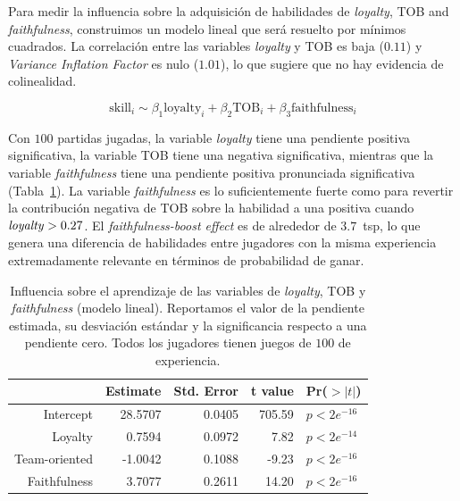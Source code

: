 \documentclass[a4paper,11pt]{book}
\theoremstyle{definition}
\begin{document}

Para medir la influencia sobre la adquisici\'on de habilidades de \emph{loyalty}, TOB and \emph{faithfulness}, construimos un modelo lineal que ser\'a resuelto por m\'inimos cuadrados.
%
La correlaci\'on entre las variables \emph{loyalty} y TOB es baja ($0.11$) y \emph{Variance Inflation Factor} es nulo ($1.01$), lo que sugiere que no hay evidencia de colinealidad.

\begin{equation}
\text{skill}_i \sim \beta_1\text{loyalty}_i + \beta_2\text{TOB}_i + \beta_3\text{faithfulness}_i
\end{equation}

Con $100$ partidas jugadas, la variable \emph{loyalty} tiene una pendiente positiva significativa, la variable TOB tiene una negativa significativa, mientras que la variable \emph{faithfulness} tiene una pendiente positiva pronunciada significativa (Tabla~\ref{model}).
%
La variable \emph{faithfulness} es lo suficientemente fuerte como para revertir la contribuci\'on negativa de TOB sobre la habilidad a una positiva cuando $\text{\emph{loyalty}}>0.27$.
%
El \emph{faithfulness-boost effect} es de alrededor de $3.7$~tsp, lo que genera una diferencia de habilidades entre jugadores con la misma experiencia extremadamente relevante en t\'erminos de probabilidad de ganar.

\begin{table}[ht]
\centering
\begin{tabular}{rrrrl}
  \hline
 & Estimate & Std. Error & t value & Pr($>|t|$) \\
  \hline
Intercept & 28.5707 & 0.0405 & 705.59 & $p< 2e^{-16}$ \\
  Loyalty & 0.7594 & 0.0972 & 7.82 & $p< 2e^{-14}$ \\
  Team-oriented & -1.0042 & 0.1088 & -9.23 & $p< 2e^{-16}$ \\
  Faithfulness & 3.7077 & 0.2611 & 14.20 & $p< 2e^{-16}$ \\
   \hline
\end{tabular}
\caption{
Influencia sobre el aprendizaje de las variables de \emph{loyalty}, TOB y \emph{faithfulness} (modelo lineal). Reportamos el valor de la pendiente estimada, su desviaci\'on est\'andar y la significancia respecto a una pendiente cero. Todos los jugadores tienen juegos de $100$ de experiencia.
}
\label{model}
\end{table}
\end{document}
